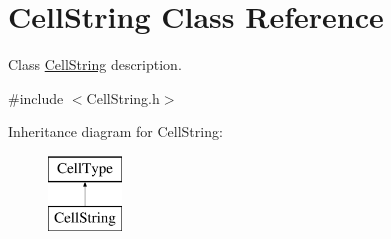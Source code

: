 \hypertarget{class_cell_string}{}\section{Cell\+String Class Reference}
\label{class_cell_string}


Class \hyperlink{class_cell_string}{Cell\+String} description.  




{\ttfamily \#include $<$Cell\+String.\+h$>$}

Inheritance diagram for Cell\+String\+:\begin{figure}[H]
\begin{center}
\leavevmode
\includegraphics[height=2.000000cm]{class_cell_string}
\end{center}
\end{figure}
